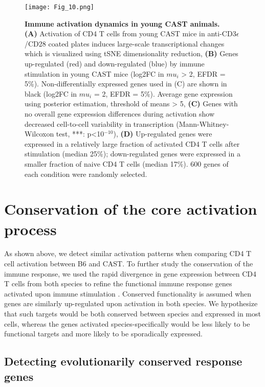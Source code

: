 \begin{figure}[!ht]
\centering
\texttt{[image: Fig\_10.png]}
\caption[Immune activation dynamics in young CAST animals]{\textbf{Immune activation dynamics in young CAST animals.}\\
\textbf{(A)} Activation of CD4\plus{} T cells from young CAST mice in anti-CD3$\epsilon$/CD28 coated plates induces large-scale transcriptional changes which is visualized using tSNE dimensionality reduction, \textbf{(B)} Genes up-regulated (red) and down-regulated (blue) by immune stimulation in young CAST mice (log2FC in $mu_i$ > 2, EFDR = 5\%). Non-differentially expressed genes used in (C) are shown in black (log2FC in $mu_i$ = 2, EFDR = 5\%). Average gene expression using posterior estimation, threshold of means > 5, \textbf{(C)} Genes with no overall gene expression differences during activation show decreased cell-to-cell variability in transcription (Mann-Whitney-Wilcoxon test, ***: p<10$^{-10}$), \textbf{(D)} Up-regulated genes were expressed in a relatively large fraction of activated CD4\plus{} T cells after stimulation (median 25\%); down-regulated genes were expressed in a smaller fraction of naive CD4\plus{} T cells (median 17\%). 600 genes of each condition were randomly selected.}
\label{fig1:immune_activation_CAST}
\end{figure}

\newpage

\section{Conservation of the core activation process}

As shown above, we detect similar activation patterns when comparing CD4\plus{} T cell activation between B6 and CAST. To further study the conservation of the immune response, we used the rapid divergence in gene expression between CD4\plus{} T cells from both species to refine the functional immune response genes activated upon immune stimulation \citep{Shay2013}. Conserved functionality is assumed when genes are similarly up-regulated upon activation in both species. We hypothesize that such targets would be both conserved between species and expressed in most cells, whereas the genes activated species-specifically would be less likely to be functional targets and more likely to be sporadically expressed.

\subsection{Detecting evolutionarily conserved response genes}

